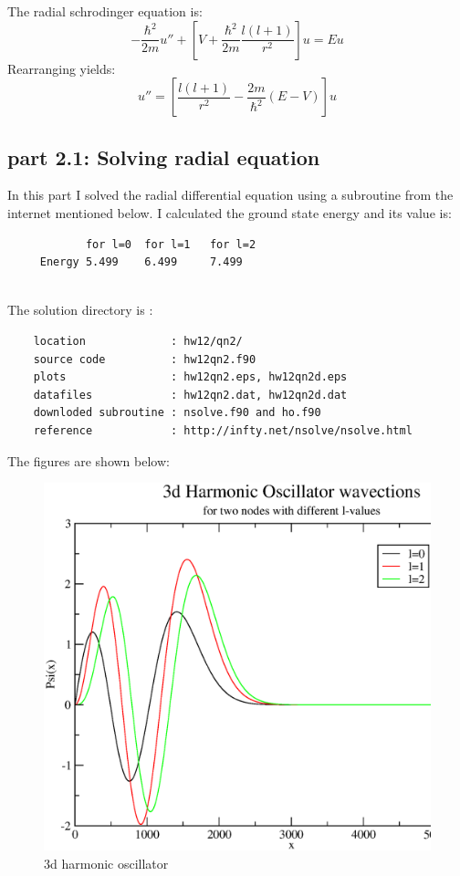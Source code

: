 \documentclass[11pt,a4paper,english]{article}
\newcommand{\beq}{\begin{equation}}
\newcommand{\eeq}{\end{equation}}
\begin{document}
	The radial schrodinger equation is:\\
	\beq 
	-\frac{\hbar^2}{2m}u'' + [V + \frac{\hbar^2}{2m} \frac{l(l+1)}{r^2}]u = Eu
	\eeq 
	Rearranging yields:\\
	\beq 
	u'' = [\frac{l(l+1)}{r^2} - \frac{2m}{\hbar^2}(E-V) ]u 
    \eeq 

   	
	\subsection{part 2.1: Solving radial equation }
	
	In this part I solved the radial differential equation using a subroutine from the internet mentioned below.
	I calculated the ground state energy and its value is:\\
	\begin{verbatim}
	        for l=0  for l=1   for l=2
	 Energy 5.499    6.499     7.499   
	 
	\end{verbatim}
	
	
		The solution directory is :\\
	\begin{verbatim}
	location             : hw12/qn2/ 
	source code          : hw12qn2.f90
	plots                : hw12qn2.eps, hw12qn2d.eps
	datafiles            : hw12qn2.dat, hw12qn2d.dat
	downloded subroutine : nsolve.f90 and ho.f90
	reference            : http://infty.net/nsolve/nsolve.html
	\end{verbatim}
	
		    The figures are shown below:\\
	\begin{figure}[h!]
	\centering
	\includegraphics [scale=0.6]{figures/hw12qn2.eps}
	\caption{$3$d harmonic oscillator }
	\end{figure}
	\clearpage
    
\end{document}
